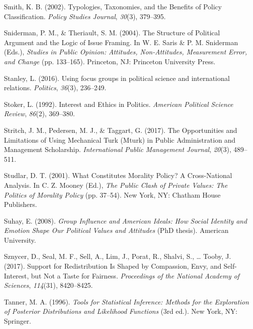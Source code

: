 \documentclass[12pt,econ]{sources/authesis}
\begin{document}
\leavevmode\hypertarget{ref-smith_typologies_2002}{}%
Smith, K. B. (2002). Typologies, Taxonomies, and the Benefits of Policy Classification. \emph{Policy Studies Journal}, \emph{30}(3), 379--395.

\leavevmode\hypertarget{ref-sniderman_structure_2004}{}%
Sniderman, P. M., \& Theriault, S. M. (2004). The Structure of Political Argument and the Logic of Issue Framing. In W. E. Saris \& P. M. Sniderman (Eds.), \emph{Studies in Public Opinion: Attitudes, Non-Attitudes, Measurement Error, and Change} (pp. 133--165). Princeton, NJ: Princeton University Press.

\leavevmode\hypertarget{ref-stanley_2016_using}{}%
Stanley, L. (2016). Using focus groups in political science and international relations. \emph{Politics}, \emph{36}(3), 236--249.

\leavevmode\hypertarget{ref-stoker_1992_interest}{}%
Stoker, L. (1992). Interest and Ethics in Politics. \emph{American Political Science Review}, \emph{86}(2), 369--380.

\leavevmode\hypertarget{ref-stritch_2017_opportunities}{}%
Stritch, J. M., Pedersen, M. J., \& Taggart, G. (2017). The Opportunities and Limitations of Using Mechanical Turk (Mturk) in Public Administration and Management Scholarship. \emph{International Public Management Journal}, \emph{20}(3), 489--511.

\leavevmode\hypertarget{ref-studlar_2001_what}{}%
Studlar, D. T. (2001). What Constitutes Morality Policy? A Cross-National Analysis. In C. Z. Mooney (Ed.), \emph{The Public Clash of Private Values: The Politics of Morality Policy} (pp. 37--54). New York, NY: Chatham House Publishers.

\leavevmode\hypertarget{ref-suhay_2008_group}{}%
Suhay, E. (2008). \emph{Group Influence and American Ideals: How Social Identity and Emotion Shape Our Political Values and Attitudes} (PhD thesis). American University.

\leavevmode\hypertarget{ref-sznycer_2017_support}{}%
Sznycer, D., Seal, M. F., Sell, A., Lim, J., Porat, R., Shalvi, S., \ldots{} Tooby, J. (2017). Support for Redistribution Is Shaped by Compassion, Envy, and Self-Interest, but Not a Taste for Fairness. \emph{Proceedings of the National Academy of Sciences}, \emph{114}(31), 8420--8425.

\leavevmode\hypertarget{ref-tanner_1996_tools}{}%
Tanner, M. A. (1996). \emph{Tools for Statistical Inference: Methods for the Exploration of Posterior Distributions and Likelihood Functions} (3rd ed.). New York, NY: Springer.
\end{document}
